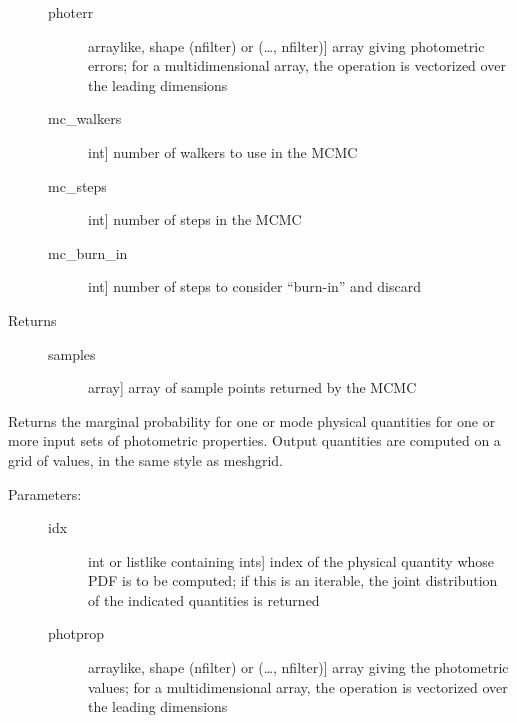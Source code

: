 \documentclass[letterpaper,10pt,english]{sphinxmanual}
\begin{document}
\begin{fulllineitems}
\begin{fulllineitems}
\begin{description}
\begin{description}
\item[{photerr}] \leavevmode{[}arraylike, shape (nfilter) or (…, nfilter){]}
array giving photometric errors; for a multidimensional
array, the operation is vectorized over the leading
dimensions

\item[{mc\_walkers}] \leavevmode{[}int{]}
number of walkers to use in the MCMC

\item[{mc\_steps}] \leavevmode{[}int{]}
number of steps in the MCMC

\item[{mc\_burn\_in}] \leavevmode{[}int{]}
number of steps to consider “burn-in” and discard

\end{description}

\item[{Returns}] \leavevmode\begin{description}
\item[{samples}] \leavevmode{[}array{]}
array of sample points returned by the MCMC

\end{description}

\end{description}

\end{fulllineitems}


\begin{fulllineitems}
\label{\detokenize{bayesphot:slugpy.bayesphot.bp.bp.mpdf}}
Returns the marginal probability for one or mode physical
quantities for one or more input sets of photometric
properties. Output quantities are computed on a grid of
values, in the same style as meshgrid.
\begin{description}
\item[{Parameters:}] \leavevmode\begin{description}
\item[{idx}] \leavevmode{[}int or listlike containing ints{]}
index of the physical quantity whose PDF is to be
computed; if this is an iterable, the joint distribution of
the indicated quantities is returned

\item[{photprop}] \leavevmode{[}arraylike, shape (nfilter) or (…, nfilter){]}
array giving the photometric values; for a
multidimensional array, the operation is vectorized over
the leading dimensions


\end{description}
\end{description}
\end{fulllineitems}
\end{fulllineitems}
\end{document}
